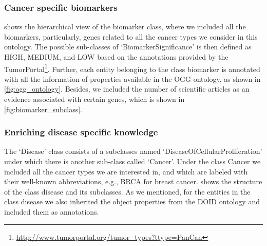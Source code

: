 \subsubsection{Cancer specific biomarkers}
 shows the hierarchical view of the biomarker class, where we included all the biomarkers, particularly, genes related to all the cancer types we consider in this ontology. The possible sub-classes of `BiomarkerSignificance' is then defined as HIGH, MEDIUM, and LOW based on the annotations provided by the TumorPortal\footnote{\url{http://www.tumorportal.org/tumor_types?ttype=PanCan}}. Further, each entity belonging to the class biomarker is annotated with all the information of properties available in the OGG ontology, as shown in \cref{fig:ogg_ontology}. Besides, we included the number of scientific articles as an evidence associated with certain genes, which is shown in \cref{fig:biomarker_subclass}.

\subsubsection{Enriching disease specific knowledge}
The `Disease' class consists of a subclasses named  `DiseaseOfCellularProliferation' under which there is another sub-class called `Cancer'. Under the class Cancer we included all the cancer types we are interested in, and which are labeled with their well-known abbreviations, e.g., BRCA for breast cancer.  shows the structure of the class disease and its subclasses. As we mentioned, for the entities in the class disease we also inherited the object properties from the DOID ontology and included them as annotations. 


